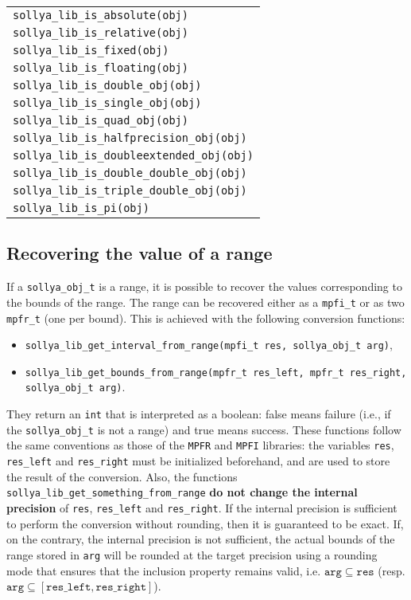 \documentclass[a4paper]{article}
\begin{document}
\begin{table}[htp]
\begin{center}
\begin{tabular}{|l|}
      \verb|sollya_lib_is_absolute(obj)| \\
      \verb|sollya_lib_is_relative(obj)| \\
      \verb|sollya_lib_is_fixed(obj)| \\
      \verb|sollya_lib_is_floating(obj)| \\
      \verb|sollya_lib_is_double_obj(obj)| \\
      \verb|sollya_lib_is_single_obj(obj)| \\
      \verb|sollya_lib_is_quad_obj(obj)| \\
      \verb|sollya_lib_is_halfprecision_obj(obj)| \\
      \verb|sollya_lib_is_doubleextended_obj(obj)| \\
      \verb|sollya_lib_is_double_double_obj(obj)| \\
      \verb|sollya_lib_is_triple_double_obj(obj)| \\
      \verb|sollya_lib_is_pi(obj)| \\
      \hline
  \end{tabular}
\end{center}
\end{table}

\subsection{Recovering the value of a range}
If a \verb|sollya_obj_t| is a range, it is possible to recover the values corresponding to the bounds of the range. The range can be recovered either as a \verb|mpfi_t| or as two \verb|mpfr_t| (one per bound). This is achieved with the following conversion functions:
\begin{itemize}
\item \verb|sollya_lib_get_interval_from_range(mpfi_t res, sollya_obj_t arg)|,
\item \verb|sollya_lib_get_bounds_from_range(mpfr_t res_left, mpfr_t res_right, sollya_obj_t arg)|.
\end{itemize}
They return an \verb|int| that is interpreted as a boolean: false means failure (i.e., if the \verb|sollya_obj_t| is not a range) and true means success. These functions follow the same conventions as those of the \verb|MPFR| and \verb|MPFI| libraries: the variables \verb|res|, \verb|res_left| and \verb|res_right| must be initialized beforehand, and are used to store the result of the conversion. Also, the functions \verb|sollya_lib_get_something_from_range| \textbf{do not change the internal precision} of \verb|res|, \verb|res_left| and \verb|res_right|. If the internal precision is sufficient to perform the conversion without rounding, then it is guaranteed to be exact. If, on the contrary, the internal precision is not sufficient, the actual bounds of the range stored in \verb|arg| will be rounded at the target precision using a rounding mode that ensures that the inclusion property remains valid, i.e. $\mathtt{arg} \subseteq \mathtt{res}$ (resp. $\mathtt{arg} \subseteq [\mathtt{res\_left}, \mathtt{res\_right}]$).
\end{document}
